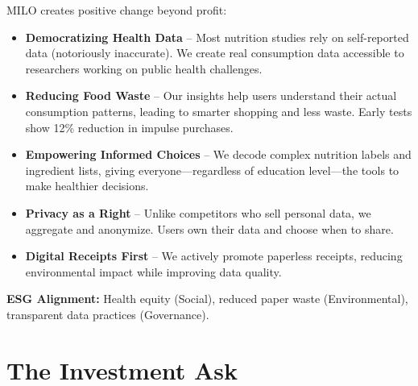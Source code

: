 \documentclass[11pt,a4paper]{report}
\begin{document}
MILO creates positive change beyond profit:

\begin{itemize}[leftmargin=2em, itemsep=6pt]
    \item \textbf{Democratizing Health Data} -- Most nutrition studies rely on self-reported data (notoriously inaccurate). We create real consumption data accessible to researchers working on public health challenges.

    \item \textbf{Reducing Food Waste} -- Our insights help users understand their actual consumption patterns, leading to smarter shopping and less waste. Early tests show 12\% reduction in impulse purchases.

    \item \textbf{Empowering Informed Choices} -- We decode complex nutrition labels and ingredient lists, giving everyone---regardless of education level---the tools to make healthier decisions.

    \item \textbf{Privacy as a Right} -- Unlike competitors who sell personal data, we aggregate and anonymize. Users own their data and choose when to share.

    \item \textbf{Digital Receipts First} -- We actively promote paperless receipts, reducing environmental impact while improving data quality.
\end{itemize}

\textbf{ESG Alignment:} Health equity (Social), reduced paper waste (Environmental), transparent data practices (Governance).

\section{The Investment Ask}
\end{document}
